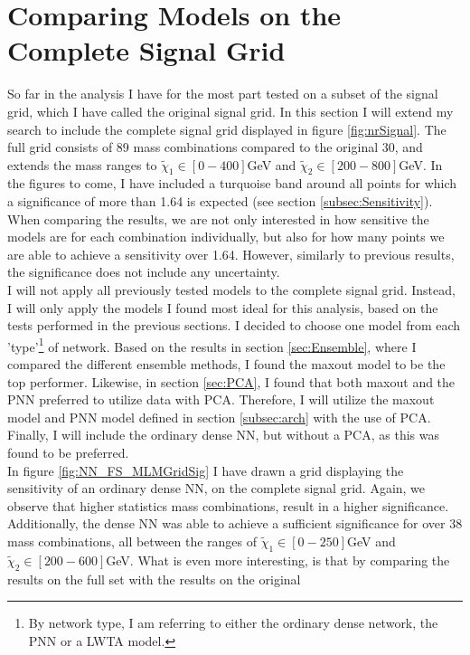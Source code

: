 \section{Comparing Models on the Complete Signal Grid}\label{sec:FS}
So far in the analysis I have for the most part tested on a subset of the signal grid, which I have called the original signal grid. In this section 
I will extend my search to include the complete signal grid displayed in figure \ref{fig:nrSignal}. The full grid consists of 89 mass 
combinations compared to the original 30, and extends the mass ranges to $\tilde{\chi}_1 \in [0-400]$GeV and $\tilde{\chi}_2 \in [200-800]$GeV.
In the figures to come, I have included a turquoise band around all points for which a significance of more than 1.64 is expected (see section \ref{subsec:Sensitivity}).
When comparing the results, we are not only interested in how sensitive the models are for each combination individually, but also for how many points we are 
able to achieve a sensitivity over 1.64. However, similarly to previous results, the significance does not include any uncertainty.
\\
I will not apply all previously tested models to the complete signal grid. Instead, I will only apply the models I found most ideal for this analysis, based 
on the tests performed in the previous sections. I decided to choose one model from each 'type'\footnote{By network type, I am referring to either the ordinary dense network, the 
\ac{PNN} or a \ac{LWTA} model. } of network. Based on the results in section \ref{sec:Ensemble}, where I compared the different ensemble methods, I found the maxout model to be 
the top performer. Likewise, in section \ref{sec:PCA}, I found that both maxout and the \ac{PNN} preferred to utilize data with \ac{PCA}. Therefore, I will utilize the maxout model 
and \ac{PNN} model defined in section \ref{subsec:arch} with the use of \ac{PCA}. Finally, I will include the ordinary dense \ac{NN}, but without a \ac{PCA}, 
as this was found to be preferred.
\\
In figure \ref{fig:NN_FS_MLMGridSig} I have drawn a grid displaying the sensitivity of an ordinary dense \ac{NN}, on the complete signal grid. Again, we observe that higher statistics
mass combinations, result in a higher significance. Additionally, the dense \ac{NN} was able to achieve a sufficient significance for over 38 mass combinations, all between the ranges of 
$\tilde{\chi}_1 \in [0-250]$GeV and $\tilde{\chi}_2 \in [200-600]$GeV. What is even more interesting, is that by comparing the results on the full set with the results on the original 
